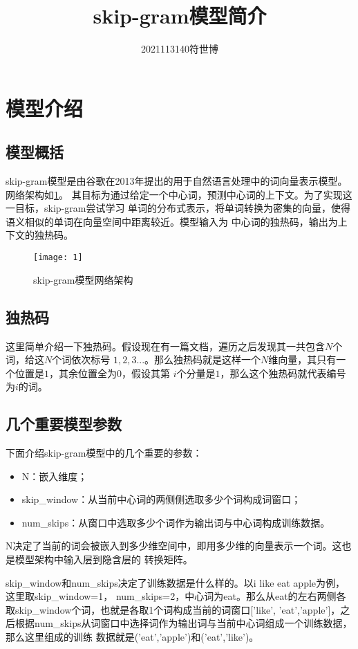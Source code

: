\documentclass[withoutpreface,bwprint]{cumcmthesis}
\title{\textbf{skip-gram模型简介}}
\author{2021113140\quad 符世博}
\date{}
\begin{document}
\maketitle
\section{模型介绍}
\subsection{模型概括}
skip-gram模型是由谷歌在2013年提出的用于自然语言处理中的词向量表示模型。网络架构如\cref{fig:1.1}。
其目标为通过给定一个中心词，预测中心词的上下文。为了实现这一目标，skip-gram尝试学习
单词的分布式表示，将单词转换为密集的向量，使得语义相似的单词在向量空间中距离较近。模型输入为
中心词的独热码，输出为上下文的独热码。

\begin{figure}[H]
    \centering
    \texttt{[image: 1]}
    \caption{skip-gram模型网络架构}
    \label{fig:1.1}
\end{figure}
\subsection{独热码}
这里简单介绍一下独热码。假设现在有一篇文档，遍历之后发现其一共包含$N$个词，给这$N$个词依次标号
$1,2,3...$。那么独热码就是这样一个$N$维向量，其只有一个位置是$1$，其余位置全为$0$，假设其第
$i$个分量是$1$，那么这个独热码就代表编号为$i$的词。

\subsection{几个重要模型参数}

下面介绍skip-gram模型中的几个重要的参数：
\begin{itemize}
    \item N：嵌入维度；
    \item skip\_window：从当前中心词的两侧侧选取多少个词构成词窗口；
    \item num\_skips：从窗口中选取多少个词作为输出词与中心词构成训练数据。
\end{itemize}

N决定了当前的词会被嵌入到多少维空间中，即用多少维的向量表示一个词。这也是模型架构中输入层到隐含层的
转换矩阵。

skip\_window和num\_skips决定了训练数据是什么样的。以i like eat apple为例，这里取skip\_window=1，
num\_skips=2，中心词为eat。那么从eat的左右两侧各取skip\_window个词，也就是各取1个词构成当前的词窗口['like',
'eat','apple']，之后根据num\_skips从词窗口中选择词作为输出词与当前中心词组成一个训练数据，那么这里组成的训练
数据就是('eat','apple')和('eat','like')。
\end{document}
